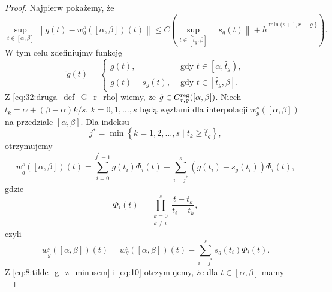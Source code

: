 \documentclass[oik, pdftex, robocza, man]{mgrwms}
\begin{document}
    \begin{proof}
        Najpierw pokażemy, że
        \begin{equation} \label{eq:7}
            \sup _{t \in[\alpha, \beta]}\left\|g(t)-w_{g}^{s}([\alpha, \beta])(t)\right\| \leq C\left(\sup _{t \in\left[\hat{t}_{g}, \beta\right]}\left\|s_{g}(t)\right\|+\bar{h}^{\min (s+1, r+\varrho\}}\right).
        \end{equation}
        W tym celu zdefiniujmy funkcję
        \begin{equation} \label{eq:8:tilde_g_z_minusem}
            \tilde{g}(t)= \begin{cases}
                g(t),            & \text { gdy } t \in\left[\alpha, \hat{t}_{g}\right), \\ 
                g(t)-s_{g}(t),   & \text { gdy } t \in\left[\hat{t}_{g}, \beta\right].
            \end{cases}
        \end{equation}
        Z \eqref{eq:32:druga_def_G_r_rho} wiemy, że $\tilde{g} \in G_{r, \varrho}^{\mathrm{reg}}([\alpha, \beta])$. Niech $t_{k}=\alpha+(\beta-\alpha) k / s$, $k=0,1, \ldots, s$ będą węzłami dla interpolacji $w_{g}^{s}([\alpha, \beta])$ na przedziale $[\alpha, \beta]$. Dla indeksu
        \begin{equation} \label{eq:9}
            j^{*}=\min \left\{k=1,2, \ldots, s \mid t_{k} \geq \hat{t}_{g}\right\},
        \end{equation}
        otrzymujemy
        \begin{equation} \label{eq:10}
            w_{\tilde{g}}^{s}([\alpha, \beta])(t)=\sum_{i=0}^{j^{*}-1} g\left(t_{i}\right) \Phi_{i}(t)+\sum_{i=j^{*}}^{s}\left(g\left(t_{i}\right)-s_{g}\left(t_{i}\right)\right) \Phi_{i}(t),
        \end{equation}
        gdzie
        \begin{equation*}
            \Phi_{i}(t)=\prod_{\substack{k=0 \\ k \neq i}}^{s} \frac{t-t_{k}}{t_{i}-t_{k}},
        \end{equation*}
        czyli
        \begin{equation*} \label{eq:11}
            w_{\tilde{g}}^{s}([\alpha, \beta])(t)=w_{g}^{s}([\alpha, \beta])(t)-\sum_{i=j^{*}}^{s} s_{g}\left(t_{i}\right) \Phi_{i}(t).
        \end{equation*}
        Z \eqref{eq:8:tilde_g_z_minusem} i \eqref{eq:10} otrzymujemy, że dla $t \in [\alpha, \beta]$ mamy
        \begin{equation*} \label{eq:12}

\end{equation*}
\end{proof}
\end{document}
